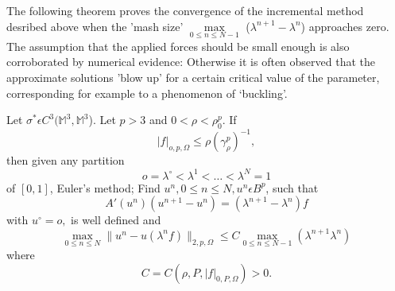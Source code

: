   The following theorem proves the convergence of the incremental
  method desribed above when the 'mash size' $\max \limits_{0 \le n
    \le N -1}$ ($\lambda^{n+1} - \lambda^n$) approaches zero. The
  assumption that the applied forces should be small enough is also
  corroborated by numerical evidence: Otherwise it is often observed
  that the approximate solutions 'blow up' for a certain critical
  value of the parameter, corresponding for example to a phenomenon of
  `buckling'. 

\begin{theorem}\label{chap2-thm2.4.2}%
  Let $\sigma^* \epsilon C^3 (\mathbb{M}^3 ,\mathbb{M}^3$). Let $p
  > 3$ and $0 < \rho < \rho^p_0$. If 
  $$
  | f |_{o, p, \Omega} \le \rho (\gamma^p_\rho)^{-1},
  $$
  then given any partition
  $$
  o = \lambda^\circ < \lambda^1 <\ldots < \lambda^N = 1
  $$
  of $[0,1]$, Euler's method; Find $u^n , 0 \le n \le N , u^n
  \epsilon B^p$, such that  
  \begin{equation*}
    A'(u^n)(u^{n+1} - u^n) = ( \lambda^{n+1} - \lambda^n)
  f \tag{2.4-11}\label{eq2.4-11} 
  \end{equation*}
  with $u^\circ = o,$ is well defined and 
 \begin{equation*}
   \max_{0 \le n \le N} \| u^n - u(\lambda^n f) \|_{2,p ,\Omega} \le
    C \max_{0 \le n \le N-1} (\lambda^{n+1} \lambda^n) \tag{2.4-12}
    \end{equation*}
where
$$
  C = C (\rho , P, |f|_{0, P,\Omega}) > 0.
$$\pageoriginale
\end{theorem}


